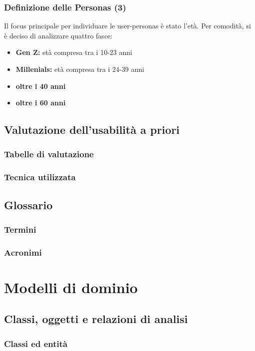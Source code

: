 \documentclass{article}
\begin{document}
			\subsubsection{Definizione delle Personas (3)}
			Il focus principale per individuare le user-personas è stato l'età.
			Per comodità, si è deciso di analizzare quattro fasce:
			\begin{itemize}
				\item \textbf{Gen Z:} età compresa tra i 10-23 anni
				\item \textbf{Millenials:} età compresa tra i 24-39 anni
				\item \textbf{oltre i 40 anni}
				\item \textbf{oltre i 60 anni}
			\end{itemize}
			
		\subsection{Valutazione dell'usabilità a priori}
			\subsubsection{Tabelle di valutazione}
			\subsubsection{Tecnica utilizzata}
		\subsection{Glossario}
			\subsubsection{Termini}
			\subsubsection{Acronimi}
	\section{Modelli di dominio}
		\subsection{Classi, oggetti e relazioni di analisi}
			\subsubsection{Classi ed entità}
\end{document}
